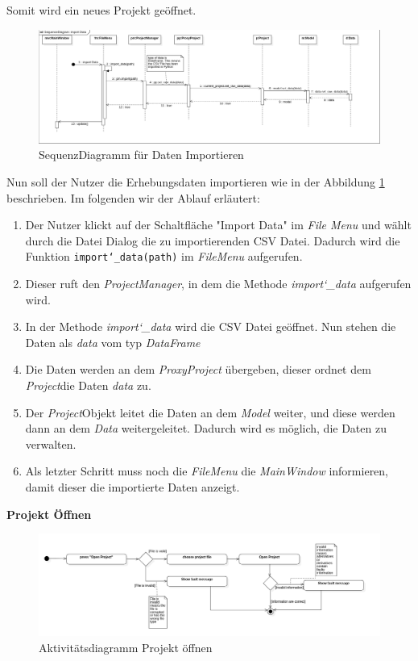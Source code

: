 \documentclass{article}
\begin{document}
Somit wird ein neues Projekt geöffnet.
\begin{figure}[H]%
    \includegraphics[width=15cm]{entwurf/Entwurf_dokument/img/Alissa/SQImportDataFinal.png}
    \caption{SequenzDiagramm für Daten Importieren}
    \label{fig:sq:importData}
\end{figure}
Nun soll der Nutzer die Erhebungsdaten importieren wie in der Abbildung \ref{fig:sq:importData} beschrieben. Im folgenden wir der Ablauf erläutert:
\begin{enumerate}
    \item[1.] Der Nutzer klickt auf der Schaltfläche "Import Data" im \textit{File Menu} und wählt durch die Datei Dialog die zu importierenden CSV Datei. Dadurch wird die Funktion \texttt{import\char`_data(path)} im \textit{FileMenu} aufgerufen.
    \item[2.] Dieser ruft den \textit{ProjectManager}, in dem die Methode \textit{import\char`_data} aufgerufen wird.
    \item[3.] In der Methode \textit{import\char`_data} wird die CSV Datei geöffnet. Nun stehen die Daten als \textit{data} vom typ \textit{DataFrame}
    \item[4.] Die Daten werden an dem \textit{ProxyProject} übergeben, dieser ordnet dem \textit{Project}\textendash die Daten \textit{data} zu.
    \item[5.] Der \textit{Project}\textendash Objekt leitet die Daten an dem \textit{Model} weiter, und diese werden dann an dem \textit{Data} weitergeleitet. Dadurch wird es möglich, die Daten zu verwalten.
    \item[6.] Als letzter Schritt muss noch die \textit{FileMenu} die \textit{MainWindow} informieren, damit dieser die importierte Daten anzeigt. 
\end{enumerate}
\newpage
\textbf{\large{Projekt Öffnen}}
\begin{figure}[H]%
    \centering
    \includegraphics[width=13cm]{entwurf/Entwurf_dokument/img/Alissa/OpenProjectAD.png}
    \caption{Aktivitätsdiagramm Projekt öffnen}
\end{figure}
\end{document}
